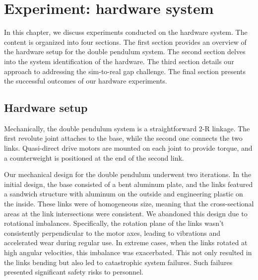 \chapter{Experiment: hardware system}
In this chapter, we discuss experiments conducted on the hardware system. The content is organized into four sections. The first section provides an overview of the hardware setup for the double pendulum system. The second section delves into the system identification of the hardware. The third section details our approach to addressing the sim-to-real gap challenge. The final section presents the successful outcomes of our hardware experiments.

\section{Hardware setup}
Mechanically, the double pendulum system is a straightforward 2-R linkage. The first revolute joint attaches to the base, while the second one connects the two links. Quasi-direct drive motors are mounted on each joint to provide torque, and a counterweight is positioned at the end of the second link.

Our mechanical design for the double pendulum underwent two iterations. In the initial design, the base consisted of a bent aluminum plate, and the links featured a sandwich structure with aluminum on the outside and engineering plastic on the inside. These links were of homogeneous size, meaning that the cross-sectional areas at the link intersections were consistent. We abandoned this design due to rotational imbalances. Specifically, the rotation plane of the links wasn't consistently perpendicular to the motor axes, leading to vibrations and accelerated wear during regular use. In extreme cases, when the links rotated at high angular velocities, this imbalance was exacerbated. This not only resulted in the links bending but also led to catastrophic system failures. Such failures presented significant safety risks to personnel.

